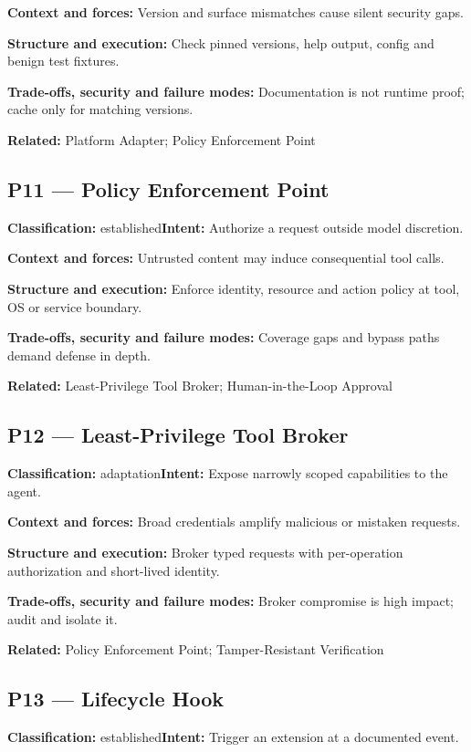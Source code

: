 \documentclass[11pt,letterpaper]{article}
\begin{document}
\textbf{Context and forces:} Version and surface mismatches cause silent security gaps.

\textbf{Structure and execution:} Check pinned versions, help output, config and benign test fixtures.

\textbf{Trade-offs, security and failure modes:} Documentation is not runtime proof; cache only for matching versions.

\textbf{Related:} Platform Adapter; Policy Enforcement Point

\subsection*{P11 --- Policy Enforcement Point}
\textbf{Classification:} established\quad\textbf{Intent:} Authorize a request outside model discretion.

\textbf{Context and forces:} Untrusted content may induce consequential tool calls.

\textbf{Structure and execution:} Enforce identity, resource and action policy at tool, OS or service boundary.

\textbf{Trade-offs, security and failure modes:} Coverage gaps and bypass paths demand defense in depth.

\textbf{Related:} Least-Privilege Tool Broker; Human-in-the-Loop Approval

\subsection*{P12 --- Least-Privilege Tool Broker}
\textbf{Classification:} adaptation\quad\textbf{Intent:} Expose narrowly scoped capabilities to the agent.

\textbf{Context and forces:} Broad credentials amplify malicious or mistaken requests.

\textbf{Structure and execution:} Broker typed requests with per-operation authorization and short-lived identity.

\textbf{Trade-offs, security and failure modes:} Broker compromise is high impact; audit and isolate it.

\textbf{Related:} Policy Enforcement Point; Tamper-Resistant Verification

\subsection*{P13 --- Lifecycle Hook}
\textbf{Classification:} established\quad\textbf{Intent:} Trigger an extension at a documented event.
\end{document}
